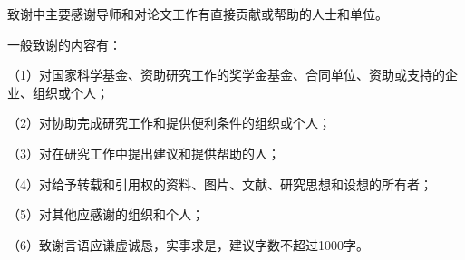\begin{ackonwlegmentback}

致谢中主要感谢导师和对论文工作有直接贡献或帮助的人士和单位。

一般致谢的内容有：

（1）对国家科学基金、资助研究工作的奖学金基金、合同单位、资助或支持的企业、组织或个人；

（2）对协助完成研究工作和提供便利条件的组织或个人；

（3）对在研究工作中提出建议和提供帮助的人；

（4）对给予转载和引用权的资料、图片、文献、研究思想和设想的所有者；

（5）对其他应感谢的组织和个人；

（6）致谢言语应谦虚诚恳，实事求是，建议字数不超过1000字。

\end{ackonwlegmentback}